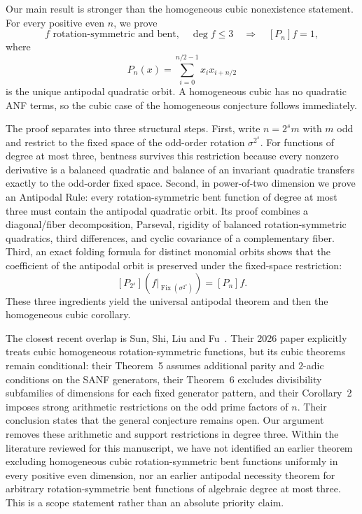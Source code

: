 \documentclass[11pt,a4paper]{article}
\theoremstyle{remark}
\theoremstyle{plain}
\newcommand{\Fix}{\operatorname{Fix}}
\begin{document}
Our main result is stronger than the homogeneous cubic nonexistence statement. For every positive even $n$, we prove
\[
\boxed{
f\text{ rotation-symmetric and bent},\quad \deg f\le3
\quad\Longrightarrow\quad
[P_n]f=1,
}
\]
where
\[
P_n(x)=\sum_{i=0}^{n/2-1}x_i x_{i+n/2}
\]
is the unique antipodal quadratic orbit. A homogeneous cubic has no quadratic ANF terms, so the cubic case of the homogeneous conjecture follows immediately.

The proof separates into three structural steps. First, write $n=2^s m$ with $m$ odd and restrict to the fixed space of the odd-order rotation $\sigma^{2^s}$. For functions of degree at most three, bentness survives this restriction because every nonzero derivative is a balanced quadratic and balance of an invariant quadratic transfers exactly to the odd-order fixed space. Second, in power-of-two dimension we prove an Antipodal Rule: every rotation-symmetric bent function of degree at most three must contain the antipodal quadratic orbit. Its proof combines a diagonal/fiber decomposition, Parseval, rigidity of balanced rotation-symmetric quadratics, third differences, and cyclic covariance of a complementary fiber. Third, an exact folding formula for distinct monomial orbits shows that the coefficient of the antipodal orbit is preserved under the fixed-space restriction:
\[
[P_{2^s}](f|_{\Fix(\sigma^{2^s})})=[P_n]f.
\]
These three ingredients yield the universal antipodal theorem and then the homogeneous cubic corollary.

The closest recent overlap is Sun, Shi, Liu and Fu~\cite{sun}. Their 2026 paper explicitly treats cubic homogeneous rotation-symmetric functions, but its cubic theorems remain conditional: their Theorem~5 assumes additional parity and $2$-adic conditions on the SANF generators, their Theorem~6 excludes divisibility subfamilies of dimensions for each fixed generator pattern, and their Corollary~2 imposes strong arithmetic restrictions on the odd prime factors of $n$. Their conclusion states that the general conjecture remains open. Our argument removes these arithmetic and support restrictions in degree three. Within the literature reviewed for this manuscript, we have not identified an earlier theorem excluding homogeneous cubic rotation-symmetric bent functions uniformly in every positive even dimension, nor an earlier antipodal necessity theorem for arbitrary rotation-symmetric bent functions of algebraic degree at most three. This is a scope statement rather than an absolute priority claim.
\end{document}
